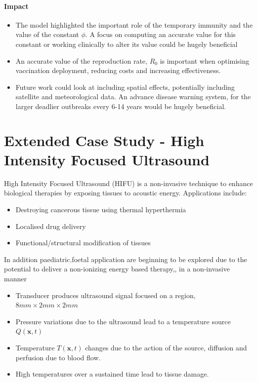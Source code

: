 \documentclass[11pt]{article} %
\begin{document}
\paragraph{Impact}

\begin{itemize}
	\item The model highlighted the important role of the temporary immunity and the value of the constant $\phi$. A focus on computing an accurate value for this constant or working clinically to alter its value could be hugely beneficial
	\item An accurate value of the reproduction rate, $ R_0 $ is important when optimising vaccination deployment, reducing costs and increasing effectiveness. 
	\item Future work could look at including spatial effects, potentially including satellite and meteorological data. An advance disease warning system, for the larger deadlier outbreaks every 6-14 years would be hugely beneficial. 
\end{itemize}
	\pagebreak
	\section{Extended Case Study - High Intensity Focused Ultrasound}
	
	High Intensity Focused Ultrasound (HIFU) is a non-invasive technique to enhance biological therapies by exposing tissues to acoustic energy. Applications include:
	\begin{itemize}
		\item Destroying cancerous tissue using thermal hyperthermia 
		\item Localised drug delivery 
		\item Functional/structural modification of tissues
	\end{itemize}
In addition paediatric.foetal application are beginning to be explored due to the potential to deliver a non-ionizing energy based therapy,, in a non-invasive manner 
	\begin{itemize}
		\item Transducer produces ultrasound signal focused on a region, $8mm\times2mm\times2mm$
		\item Pressure variations due to the ultrasound lead to a temperature source $Q(\textbf{x},t)$
		\item Temperature $T(\textbf{x},t)$ changes due to the action of the source, diffusion and perfusion due to blood flow. 
		\item High temperatures over a sustained time lead to tissue damage. 
	\end{itemize}
	
\end{document}
